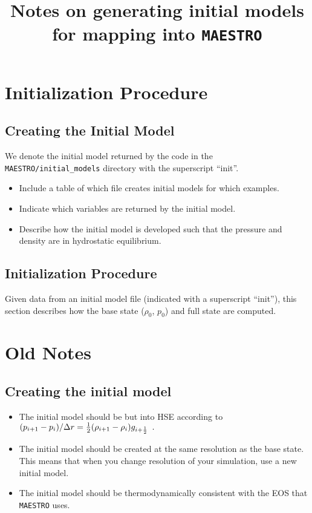 \documentclass[11pt]{article}
\title{Notes on generating initial models for mapping into {\tt MAESTRO}}
\def\half  {\frac{1}{2}}
\begin{document}
\maketitle
\tableofcontents

\clearpage

\section{Initialization Procedure}
\subsection{Creating the Initial Model}
We denote the initial model returned by the code in the {\tt MAESTRO/initial\_models} directory with the superscript ``init''.
\begin{itemize}
\item Include a table of which file creates initial models for which examples.
\item Indicate which variables are returned by the initial model.
\item Describe how the initial model is developed such that the pressure and density are in hydrostatic equilibrium.
\end{itemize}
\subsection{Initialization Procedure}
Given data from an initial model file (indicated with a superscript ``init''), this section describes how the base state ($\rho_0$, $p_0$) and full state are computed.

\clearpage

\section{Old Notes}
\subsection{Creating the initial model}
\begin{itemize}
\item The initial model should be but into HSE according to 
$(p_{i+1} - p_i)/\Delta r = \half (\rho_{i+1} - \rho_i) g_{i+\half} \enskip .$
\item The initial model should be created at the same resolution as
the base state.  This means that when you change resolution of your
simulation, use a new initial model.
\item The initial model should be thermodynamically consistent with
the EOS that {\tt MAESTRO} uses.
\end{itemize}
\end{document}
